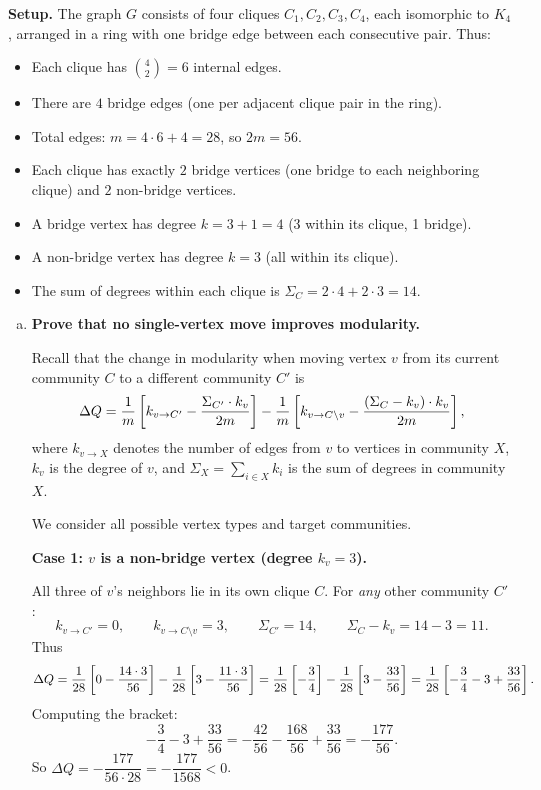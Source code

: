 \documentclass{article}
\begin{document}
\begin{tcolorbox}[colback=white, colframe=black!70, title=\textbf{Solution to Exercise 1}, breakable]

\textbf{Setup.} The graph $G$ consists of four cliques $C_1,C_2,C_3,C_4$, each isomorphic to $K_4$, arranged in a ring with one bridge edge between each consecutive pair. Thus:
\begin{itemize}
\item Each clique has $\binom{4}{2}=6$ internal edges.
\item There are $4$ bridge edges (one per adjacent clique pair in the ring).
\item Total edges: $m = 4\cdot 6 + 4 = 28$, so $2m = 56$.
\item Each clique has exactly $2$ bridge vertices (one bridge to each neighboring clique) and $2$ non-bridge vertices.
\item A bridge vertex has degree $k = 3 + 1 = 4$ (3 within its clique, 1 bridge).
\item A non-bridge vertex has degree $k = 3$ (all within its clique).
\item The sum of degrees within each clique is $\Sigma_C = 2\cdot 4 + 2\cdot 3 = 14$.
\end{itemize}

\begin{enumerate}[(a)]
\item \textbf{Prove that no single-vertex move improves modularity.}

Recall that the change in modularity when moving vertex $v$ from its current community $C$ to a different community $C'$ is
\[
\Delta Q = \frac{1}{m}\left[k_{v\to C'} - \frac{\Sigma_{C'}\cdot k_v}{2m}\right] - \frac{1}{m}\left[k_{v\to C\setminus v} - \frac{(\Sigma_C - k_v)\cdot k_v}{2m}\right],
\]
where $k_{v\to X}$ denotes the number of edges from $v$ to vertices in community $X$, $k_v$ is the degree of $v$, and $\Sigma_X = \sum_{i\in X} k_i$ is the sum of degrees in community $X$.

We consider all possible vertex types and target communities.

\medskip
\textbf{Case 1: $v$ is a non-bridge vertex (degree $k_v = 3$).}

All three of $v$'s neighbors lie in its own clique $C$. For \emph{any} other community $C'$:
\[
k_{v\to C'} = 0, \qquad k_{v\to C\setminus v} = 3, \qquad \Sigma_{C'} = 14, \qquad \Sigma_C - k_v = 14-3 = 11.
\]
Thus
\[
\Delta Q = \frac{1}{28}\left[0 - \frac{14\cdot 3}{56}\right] - \frac{1}{28}\left[3 - \frac{11\cdot 3}{56}\right]
= \frac{1}{28}\left[-\frac{3}{4}\right] - \frac{1}{28}\left[3 - \frac{33}{56}\right]
= \frac{1}{28}\left[-\frac{3}{4} - 3 + \frac{33}{56}\right].
\]
Computing the bracket:
\[
-\frac{3}{4} - 3 + \frac{33}{56} = -\frac{42}{56} - \frac{168}{56} + \frac{33}{56} = -\frac{177}{56}.
\]
So $\Delta Q = -\dfrac{177}{56\cdot 28} = -\dfrac{177}{1568} < 0$.


\end{enumerate}
\end{tcolorbox}
\end{document}
